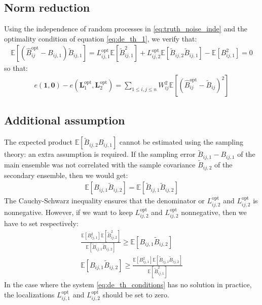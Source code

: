 \documentclass[12pt]{scrartcl}
\begin{document}
\subsection{Norm reduction}
Using the independence of random processes in \eqref{eq:truth_noise_inde} and the optimality condition of equation \eqref{eq:de_th_1}, we verify that:
\begin{align}
\mathbb{E}\left[\left(\widehat{B}_{ij}^\mathrm{opt} - B_{ij,1}\right) \widetilde{B}_{ij,1} \right] = L_{ij,1}^\mathrm{opt} \mathbb{E}\left[\widetilde{B}_{ij,1}^2\right] + L_{ij,2}^\mathrm{opt} \mathbb{E}\left[\widetilde{B}_{ij,2} \widetilde{B}_{ij,1}\right] - \mathbb{E}\left[B^2_{ij,1}\right] = 0 
\end{align}
so that:
\begin{align}
e\left(\boldsymbol{1},\boldsymbol{0}\right) - e\left(\mathbf{L}^\mathrm{opt}_1,\mathbf{L}^\mathrm{opt}_2\right) = \sum_{1 \le i,j \le n} W_{ij}^2 \mathbb{E}\left[ \left(\widehat{B}_{ij}^\mathrm{opt} - \widetilde{B}_{ij}\right)^2\right]
\end{align}

\subsection{Additional assumption}
The expected product $\displaystyle \mathbb{E} \left[\widetilde{B}_{ij,2} B_{ij,1}\right]$ cannot be estimated using the sampling theory: an extra assumption is required. If the sampling error $\widetilde{B}_{ij,1} - B_{ij,1}$ of the main ensemble was not correlated with the sample covariance $\widetilde{B}_{ij,2}$ of the secondary ensemble, then we would get:
\begin{align}
\label{eq:multihyb_assumption_1}
\mathbb{E} \left[ B_{ij,1} \widetilde{B}_{ij,2}\right] = \mathbb{E} \left[ \widetilde{B}_{ij,1} \widetilde{B}_{ij,2}\right]
\end{align}
The Cauchy-Schwarz inequality ensures that the denominator or $L_{ij,2}^\mathrm{opt}$ and $L_{ij,2}^\mathrm{opt}$ is nonnegative. However, if we want to keep $L_{ij,2}^\mathrm{opt}$ and $L_{ij,2}^\mathrm{opt}$ nonnegative, then we have to set respectively:
\begin{subequations}
\label{eq:de_th_conditions}
\begin{align}
\frac{\mathbb{E} \left[B^2_{ij,1}\right] \mathbb{E} \left[\widetilde{B}_{ij,2}^2\right]}{\mathbb{E} \left[\widetilde{B}_{ij,1} \widetilde{B}_{ij,2}\right]} \ge \mathbb{E} \left[ B_{ij,1} \widetilde{B}_{ij,2}\right] \\
\mathbb{E} \left[ B_{ij,1} \widetilde{B}_{ij,2}\right] \ge \frac{\mathbb{E} \left[B^2_{ij,1}\right] \mathbb{E} \left[\widetilde{B}_{ij,1} \widetilde{B}_{ij,2}\right]}{\mathbb{E} \left[\widetilde{B}_{ij,1}^2\right]}
\end{align}
\end{subequations}
In the case where the system \eqref{eq:de_th_conditions} has no solution in practice, the localizations $L_{ij,1}^\mathrm{opt}$ and $L_{ij,2}^\mathrm{opt}$ should be set to zero.
\end{document}
